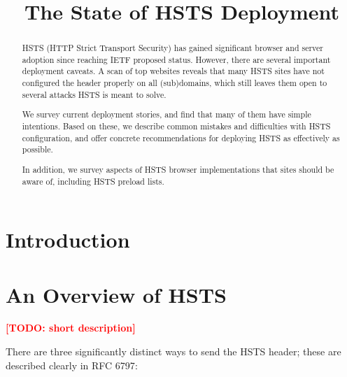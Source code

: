 \documentclass[conference]{./IEEEtran}
\newcommand{\todo}[1]{\textcolor{red}{\textbf{[TODO: #1]}}}
\theoremstyle{plain}
\begin{document}
\title{The State of HSTS Deployment}

\author{}


\maketitle

\thispagestyle{fancy}

\begin{abstract}
HSTS (HTTP Strict Transport Security) has gained significant browser and server adoption since reaching IETF proposed status. However, there are several important deployment caveats. A scan of top websites reveals that many HSTS sites have not configured the header properly on all (sub)domains, which still leaves them open to several attacks HSTS is meant to solve.

We survey current deployment stories, and find that many of them have simple intentions. Based on these, we describe common mistakes and difficulties with HSTS configuration, and offer concrete recommendations for deploying HSTS as effectively as possible.

In addition, we survey aspects of HSTS browser implementations that sites should be aware of, including HSTS preload lists.
\end{abstract}

\section{Introduction}
\label{sec:intro}

\section{An Overview of HSTS}

\todo{short description}

There are three significantly distinct ways to send the HSTS header; these are described clearly in RFC 6797\cite{rfc}:
\end{document}
